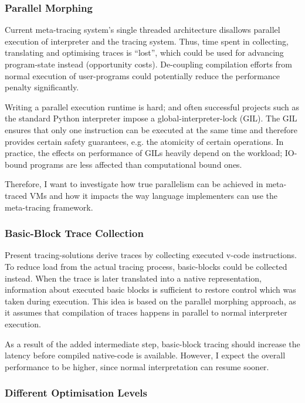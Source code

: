 

\subsubsection{Parallel Morphing} Current meta-tracing system's single threaded
architecture disallows parallel execution of interpreter and the tracing system.
Thus, time spent in collecting, translating and optimising traces is ``lost'',
which could be used for advancing program-state instead (opportunity costs).
De-coupling compilation efforts from normal execution of user-programs could
potentially reduce the performance penalty significantly.

Writing a parallel execution runtime is hard; and often successful projects such
as the standard Python interpreter impose a global-interpreter-lock (GIL). The
GIL ensures that only one instruction can be executed at the same time and
therefore provides certain safety guarantees, e.g. the atomicity of certain
operations. In practice, the effects on performance of GILs heavily depend on
the workload; IO-bound programs are less affected than computational bound ones.

Therefore, I want to investigate how true parallelism can be achieved in
meta-traced VMs and how it impacts the way language implementers can use the
meta-tracing framework.


\subsubsection{Basic-Block Trace Collection} Present tracing-solutions derive
traces by collecting executed v-code instructions. To reduce load from the
actual tracing process, basic-blocks could be collected instead. When the trace
is later translated into a native representation, information about executed
basic blocks is sufficient to restore control which was taken during execution.
This idea is based on the parallel morphing approach, as it assumes that
compilation of traces happens in parallel to normal interpreter execution.

As a result of the added intermediate step, basic-block tracing should increase
the latency before compiled native-code is available. However, I expect the
overall performance to be higher, since normal interpretation can resume sooner.

\subsubsection{Different Optimisation Levels}

